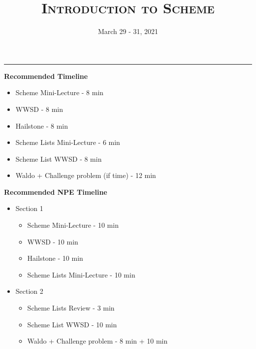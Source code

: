 \documentclass{exam}
\title{\textsc{Introduction to Scheme}}
\date{March 29 - 31, 2021}
\begin{document}
\maketitle
\rule{\textwidth}{0.15em}
\fontsize{12}{15}\selectfont

\begin{guide}
\begin{blocksection}
\textbf{Recommended Timeline}
\begin{itemize}
  \item Scheme Mini-Lecture - 8 min
  \item WWSD - 8 min
  \item Hailstone - 8 min
  \item Scheme Lists Mini-Lecture - 6 min
  \item Scheme List WWSD - 8 min
  \item Waldo + Challenge problem (if time) - 12 min
\end{itemize}
\end{blocksection}
\end{guide}

\begin{guide}
\begin{blocksection}
\textbf{Recommended NPE Timeline}
  \begin{itemize}
  \item Section 1
  \begin{itemize}
    \item Scheme Mini-Lecture - 10 min
    \item WWSD - 10 min
    \item Hailstone - 10 min
    \item Scheme Lists Mini-Lecture - 10 min
  \end{itemize}
  \item Section 2
  \begin{itemize}
    \item Scheme Lists Review - 3 min
    \item Scheme List WWSD - 10 min
    \item Waldo + Challenge problem - 8 min + 10 min
  \end{itemize}
\end{itemize}
\end{blocksection}
\end{guide}
\end{document}
